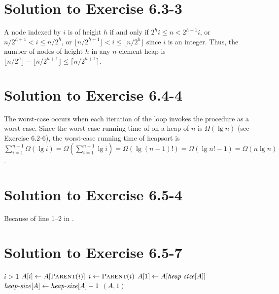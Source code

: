 \documentclass[a4paper, fleqn]{article}
\begin{document}
\section*{Solution to Exercise 6.3-3}

A node indexed by $i$ is of height $h$ if and only if $2^{h}i \leq n <
2^{h+1}i$, or $n/2^{h+1} < i \leq n/2^h$, or $\lfloor n/2^{h+1}
\rfloor < i \leq \lfloor n/2^h \rfloor$ since $i$ is an integer. Thus,
the number of nodes of height $h$ in any $n$-element heap is $\lfloor
n/2^h \rfloor - \lfloor n/2^{h+1} \rfloor \leq \lceil n/2^{h+1}
\rceil$.







\section*{Solution to Exercise 6.4-4}

The worst-case occurs when each iteration of the  loop invokes the 
 procedure as a worst-case. Since the worst-case running time 
of  on a heap of $n$ is $\Omega(\lg n)$ (see Exercise 6.2-6), 
the worst-case running time of heapsort is $\sum_{i = 1}^{n - 1} \Omega(\lg i) 
= \Omega(\sum_{i = 1}^{n - 1} \lg i) = \Omega(\lg (n - 1)!) = \Omega(\lg n! - 1) 
= \Omega(n\lg n)$.







\section*{Solution to Exercise 6.5-4}

Because of line 1--2 in .







\section*{Solution to Exercise 6.5-7}

\begin{codebox}
\li \While $i > 1$
\li     \Do
            $A[i] \gets A[\textnormal{\scshape Parent}(i)]$
\li         $i \gets \textnormal{\scshape Parent}(i)$
        \End
\li $A[1] \gets A[\id{heap-size}[A]]$
\li $\id{heap-size}[A] \gets \id{heap-size}[A] - 1$
\li {}$(A,1)$
\end{codebox}
\end{document}
